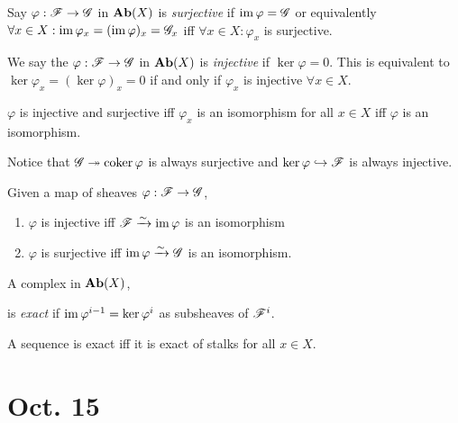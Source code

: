 \documentclass[12pt]{article}
\begin{document}
\begin{defn}
Say $\varphi : \mathscr{F} \to \mathscr{G}$ in $\mathbf{Ab}(X)$ is \textit{surjective} if $\operatorname{\mathrm{im}}{\varphi} = \mathscr{G}$ or equivalently $\forall x \in X : \operatorname{\mathrm{im}}{\varphi_x} = (\operatorname{\mathrm{im}}{\varphi})_x = \mathscr{G}_x$ iff $\forall x \in X : \varphi_x$ is surjective. 
\end{defn}

\begin{defn}
We say the $\varphi : \mathscr{F} \to \mathscr{G}$ in $\mathbf{Ab}(X)$ is \textit{injective} if $\ker{\varphi} = 0$. This is equivalent to $\ker{\varphi_x} = (\ker{\varphi})_x = 0$ if and only if $\varphi_x$ is injective $\forall x \in X$.
\end{defn}

\begin{prop}
$\varphi$ is injective and surjective iff $\varphi_x$ is an isomorphism for all $x \in X$ iff $\varphi$ is an isomorphism.
\end{prop}

\begin{rmk}
Notice that $\mathscr{G} \twoheadrightarrow \operatorname{\mathrm{coker}}{\varphi}$ is always surjective and $\ker{\varphi} \hookrightarrow \mathscr{F}$ is always injective.
\end{rmk}

\begin{prop}
Given a map of sheaves $\varphi : \mathscr{F} \to \mathscr{G}$,
\begin{enumerate}
\item $\varphi$ is injective iff $\mathscr{F} \xrightarrow{\sim} \operatorname{\mathrm{im}}{\varphi}$ is an isomorphism
\item $\varphi$ is surjective iff $\operatorname{\mathrm{im}}{\varphi} \xrightarrow{\sim} \mathscr{G}$ is an isomorphism.
\end{enumerate}
\end{prop}

\begin{defn}
A complex in $\mathbf{Ab}(X)$,
\begin{center}
\end{center}
is \textit{exact} if $\operatorname{\mathrm{im}}{\varphi^{i-1}} = \ker{\varphi^i}$ as subsheaves of $\mathscr{F}^i$.
\end{defn}

\begin{prop}
A sequence is exact iff it is exact of stalks for all $x \in X$.
\end{prop}

\section{Oct. 15}
\end{document}
